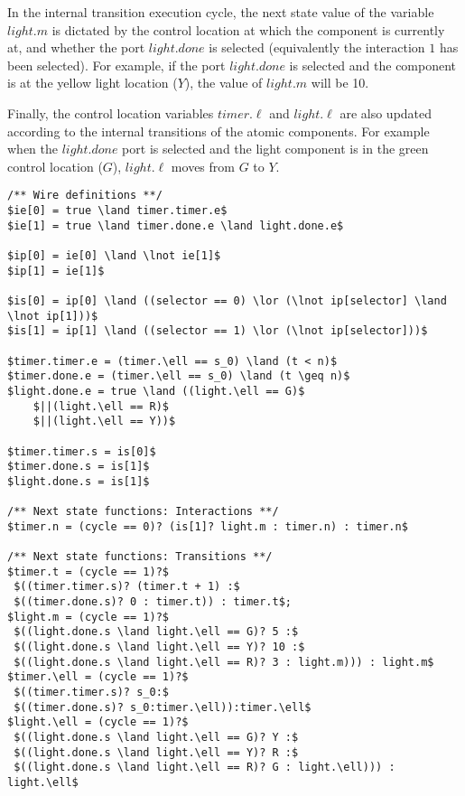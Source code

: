In the internal transition execution cycle, the next state value of
the variable $light.m$ is dictated by the control location at which the component is currently at, and whether the port $light.done$
is selected (equivalently the interaction $1$ has been selected).
For example, if the port $light.done$ is selected and the component 
is at the yellow light location ($Y$), the value of
$light.m$ will be 10. 

Finally, the control location variables $timer.\ell$ and 
$light.\ell$ are also updated according to the internal transitions of the 
atomic components. For example when the $light.done$ port is selected
and the light component is in the green control location ($G$), 
 $light.\ell$ moves from $G$ to $Y$. 

\begin{lstlisting}[caption=Sample of \biptool{} generated code,label=sample:code:bip,float=bt]
/** Wire definitions **/
$ie[0] = true \land timer.timer.e$
$ie[1] = true \land timer.done.e \land light.done.e$

$ip[0] = ie[0] \land \lnot ie[1]$
$ip[1] = ie[1]$

$is[0] = ip[0] \land ((selector == 0) \lor (\lnot ip[selector] \land \lnot ip[1]))$
$is[1] = ip[1] \land ((selector == 1) \lor (\lnot ip[selector]))$

$timer.timer.e = (timer.\ell == s_0) \land (t < n)$
$timer.done.e = (timer.\ell == s_0) \land (t \geq n)$
$light.done.e = true \land ((light.\ell == G)$ 
    $||(light.\ell == R)$
    $||(light.\ell == Y))$
    
$timer.timer.s = is[0]$
$timer.done.s = is[1]$
$light.done.s = is[1]$

/** Next state functions: Interactions **/
$timer.n = (cycle == 0)? (is[1]? light.m : timer.n) : timer.n$

/** Next state functions: Transitions **/
$timer.t = (cycle == 1)?$ 
 $((timer.timer.s)? (timer.t + 1) :$
 $((timer.done.s)? 0 : timer.t)) : timer.t$;
$light.m = (cycle == 1)?$
 $((light.done.s \land light.\ell == G)? 5 :$
 $((light.done.s \land light.\ell == Y)? 10 :$
 $((light.done.s \land light.\ell == R)? 3 : light.m))) : light.m$
$timer.\ell = (cycle == 1)?$
 $((timer.timer.s)? s_0:$
 $((timer.done.s)? s_0:timer.\ell)):timer.\ell$
$light.\ell = (cycle == 1)?$
 $((light.done.s \land light.\ell == G)? Y :$
 $((light.done.s \land light.\ell == Y)? R :$
 $((light.done.s \land light.\ell == R)? G : light.\ell))) : light.\ell$
\end{lstlisting}
%
